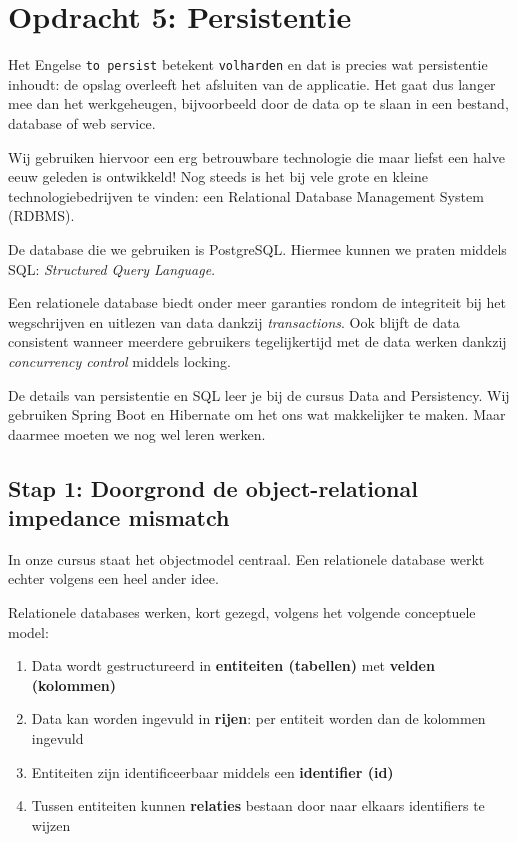 \chapter{Opdracht 5: Persistentie}
Het Engelse \texttt{to persist} betekent \texttt{volharden} 
en dat is precies wat persistentie inhoudt:
de opslag overleeft het afsluiten van de applicatie.
Het gaat dus langer mee dan het werkgeheugen, bijvoorbeeld 
door de data op te slaan in een bestand, database of web service.

Wij gebruiken hiervoor een erg betrouwbare technologie die
maar liefst een halve eeuw geleden is ontwikkeld! Nog steeds 
is het bij vele grote en kleine technologiebedrijven te vinden: 
een Relational Database Management System (RDBMS).

De database die we gebruiken is PostgreSQL. 
Hiermee kunnen we praten middels SQL:
\textit{Structured Query Language}.

Een relationele database biedt onder meer garanties rondom de 
integriteit bij het wegschrijven en uitlezen van data 
dankzij \textit{transactions}. Ook blijft de data consistent 
wanneer meerdere gebruikers tegelijkertijd met de data werken
dankzij \textit{concurrency control} middels locking.

De details van persistentie en SQL leer je bij de cursus 
Data and Persistency. Wij gebruiken Spring Boot en Hibernate
om het ons wat makkelijker te maken. Maar daarmee moeten we nog 
wel leren werken.

\section{Stap 1: Doorgrond de object-relational impedance mismatch}
In onze cursus staat het objectmodel centraal. Een relationele database 
werkt echter volgens een heel ander idee.

Relationele databases werken, kort gezegd, volgens het volgende conceptuele model:
\begin{enumerate}
    \item Data wordt gestructureerd in \textbf{entiteiten (tabellen)} met \textbf{velden (kolommen)}
    \item Data kan worden ingevuld in \textbf{rijen}: per entiteit worden dan de kolommen ingevuld
    \item Entiteiten zijn identificeerbaar middels een \textbf{identifier (id)}
    \item Tussen entiteiten kunnen \textbf{relaties} bestaan door naar elkaars identifiers te wijzen
\end{enumerate}

